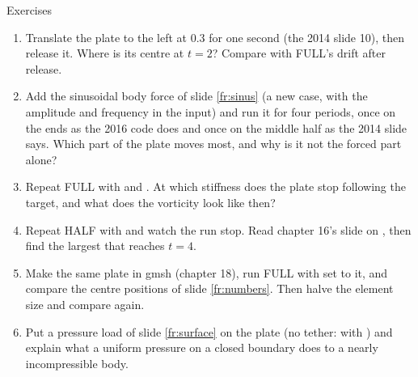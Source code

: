 \documentclass[aspectratio=169,11pt]{beamer}
\begin{document}
\begin{frame}{Exercises}
\label{fr:exercises}
\footnotesize
\begin{enumerate}
  \item Translate the plate to the left at $0.3$ for one second (the 2014 slide 10), then release it. Where is its centre at $t = 2$? Compare with FULL's drift after release.
  \item Add the sinusoidal body force of slide \ref{fr:sinus} (a new  case, with the amplitude and frequency in the input) and run it for four periods, once on the ends as the 2016 code does and once on the middle half as the 2014 slide says. Which part of the plate moves most, and why is it not the forced part alone?
  \item Repeat FULL with  and . At which stiffness does the plate stop following the target, and what does the vorticity look like then?
  \item Repeat HALF with  and watch the run stop. Read chapter 16's slide on , then find the largest  that reaches $t = 4$.
  \item Make the same plate in gmsh (chapter 18), run FULL with  set to it, and compare the centre positions of slide \ref{fr:numbers}. Then halve the element size and compare again.
  \item Put a pressure load of slide \ref{fr:surface} on the plate (no tether:  with ) and explain what a uniform pressure on a closed boundary does to a nearly incompressible body.
\end{enumerate}
\end{frame}
\end{document}
